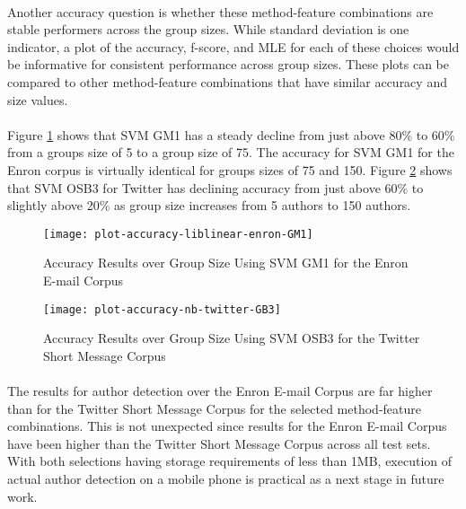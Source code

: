 \paragraph*{} Another accuracy question is whether these method-feature combinations are stable performers across the group sizes.  While standard deviation is one indicator, a plot of the accuracy, f-score, and MLE for each of these choices would be informative for consistent performance across group sizes.  These plots can be compared to other method-feature combinations that have similar accuracy and size values.

\paragraph*{} Figure \ref{fig:accuracy-liblinear-enron-GM1-over-groups} shows that SVM GM1 has a steady decline from just above 80\% to 60\% from a groups size of 5 to a group size of 75.  The accuracy for SVM GM1 for the Enron corpus is virtually identical for groups sizes of 75 and 150. Figure \ref{fig:accuracy-liblinear-twitter-OSB3-over-groups} shows that SVM OSB3 for Twitter has declining accuracy from just above 60\% to slightly above 20\% as group size increases from 5 authors to 150 authors.  

\begin{figure}[htbp!]
	\begin{center}
	\centering
	\texttt{[image: plot-accuracy-liblinear-enron-GM1]}
	\caption{Accuracy Results over Group Size Using SVM GM1 for the Enron E-mail Corpus}
	\label{fig:accuracy-liblinear-enron-GM1-over-groups}
	\end{center}
\end{figure}

\begin{figure}[htbp!]
	\begin{center}
	\centering
	\texttt{[image: plot-accuracy-nb-twitter-GB3]}
	\caption{Accuracy Results over Group Size Using SVM OSB3 for the Twitter Short Message Corpus}
	\label{fig:accuracy-liblinear-twitter-OSB3-over-groups}
	\end{center}
\end{figure}

\paragraph*{} The results for author detection over the Enron E-mail Corpus are far higher than for the Twitter Short Message Corpus for the selected method-feature combinations.  This is not unexpected since results for the Enron E-mail Corpus have been higher than the Twitter Short Message Corpus across all test sets.  With both selections having storage requirements of less than 1MB, execution of actual author detection on a mobile phone is practical as a next stage in future work.

